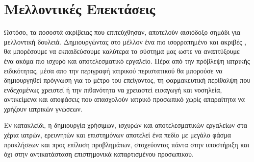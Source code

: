 \section{Μελλοντικές Επεκτάσεις}
Ωστόσο, τα ποσοστά ακρίβειας που επιτεύχθησαν, αποτελούν αισιόδοξο σημάδι για μελλοντική δουλειά. Δημιουργώντας στο μέλλον ένα πιο ισορροπημένο και ακριβές , θα μπορέσουμε να εκπαιδεύσουμε καλύτερα το σύστημα μας ωστε να αναπτύξουμε ένα ακόμα πιο ισχυρό και αποτελεσματικό εργαλείο.
Πέρα από την πρόβλεψη ιατρικής ειδικότητας, μέσα απο την περιγραφή ιατρικού περιστατικού θα μπορούσε να δημιουργηθεί πρόγνωση για το μέτρο του επείγοντος, τη φαρμακευτική περίθαλψη που ενδεχομένως χρειστεί ή την πιθανότητα να χρειαστεί εισαγωγή και νοσηλεία, αντικείμενα και αποφάσεις που απασχολούν ιατρικό προσωπικό χωρίς απαραίτητα να χρήζουν ιατρικών γνώσεων. 

Εν κατακλείδι, η δημιουργία χρήσιμων, ισχυρών και αποτελεσματικών εργαλείων στα χέρια ιατρών, ερευνητών και επιστημόνων αποτελεί ένα πεδίο με μεγάλο φάσμα προκλήσεων και προς επίλυση προβλημάτων, στοχεύοντας πάντα στην υποστήριξη και όχι στην αντικατάσταση επιστημονικά καταρτισμένου προσωπικού. 

